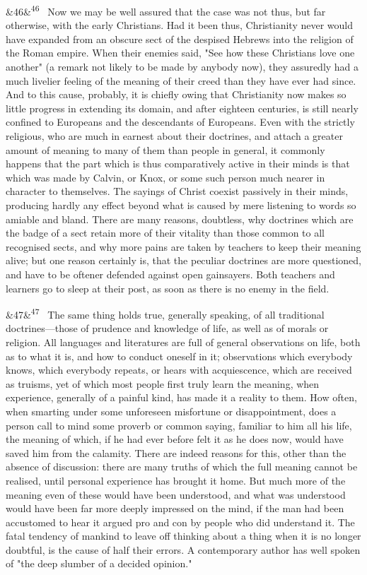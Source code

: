 \documentclass[12pt]{article}
\newcommand{\para}[1][]{\par\noindent\ifx&#1&\else\textsuperscript{\footnotesize #1}~\fi}
\begin{document}
\para[46] Now we may be well assured that the case was not thus, but far otherwise, with the early Christians. Had it been thus, Christianity never would have expanded from an obscure sect of the despised Hebrews into the religion of the Roman empire. When their enemies said, "See how these Christians love one another" (a remark not likely to be made by anybody now), they assuredly had a much livelier feeling of the meaning of their creed than they have ever had since. And to this cause, probably, it is chiefly owing that Christianity now makes so little progress in extending its domain, and after eighteen centuries, is still nearly confined to Europeans and the descendants of Europeans. Even with the strictly religious, who are much in earnest about their doctrines, and attach a greater amount of meaning to many of them than people in general, it commonly happens that the part which is thus comparatively active in their minds is that which was made by Calvin, or Knox, or some such person much nearer in character to themselves. The sayings of Christ coexist passively in their minds, producing hardly any effect beyond what is caused by mere listening to words so amiable and bland. There are many reasons, doubtless, why doctrines which are the badge of a sect retain more of their vitality than those common to all recognised sects, and why more pains are taken by teachers to keep their meaning alive; but one reason certainly is, that the peculiar doctrines are more questioned, and have to be oftener defended against open gainsayers. Both teachers and learners go to sleep at their post, as soon as there is no enemy in the field.

\para[47] The same thing holds true, generally speaking, of all traditional doctrines---those of prudence and knowledge of life, as well as of morals or religion. All languages and literatures are full of general observations on life, both as to what it is, and how to conduct oneself in it; observations which everybody knows, which everybody repeats, or hears with acquiescence, which are received as truisms, yet of which most people first truly learn the meaning, when experience, generally of a painful kind, has made it a reality to them. How often, when smarting under some unforeseen misfortune or disappointment, does a person call to mind some proverb or common saying, familiar to him all his life, the meaning of which, if he had ever before felt it as he does now, would have saved him from the calamity. There are indeed reasons for this, other than the absence of discussion: there are many truths of which the full meaning cannot be realised, until personal experience has brought it home. But much more of the meaning even of these would have been understood, and what was understood would have been far more deeply impressed on the mind, if the man had been accustomed to hear it argued pro and con by people who did understand it. The fatal tendency of mankind to leave off thinking about a thing when it is no longer doubtful, is the cause of half their errors. A contemporary author has well spoken of "the deep slumber of a decided opinion."
\end{document}
